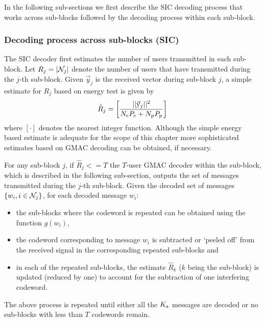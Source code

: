 In the following sub-sections we first describe the SIC decoding process that works across sub-blocks followed by the decoding process within each sub-block.

\subsubsection{Decoding process across sub-blocks (SIC)}
The SIC decoder first estimates the number of users transmitted in each sub-block. Let $R_j=|\mathcal{N}_j|$ denote the number of users that have transmitted during the $j$-th sub-block. Given $\vec{y}_j$ is the received vector during sub-block $j$, a simple estimate for $R_j$ based on energy test is given by %
\begin{align*}
\hat{R}_{j}= \left[\frac{||\vec{\mathrm{y}}_j||^2}{N_{\mathrm{c}}P_{\mathrm{c}}+N_{\mathrm{p}}P_{\mathrm{p}}}\right]
\end{align*} 
where $[\cdot ]$ denotes the nearest integer function. Although the simple energy based estimate is adequate for the scope of this chapter more sophisticated estimates based on GMAC decoding can be obtained, if necessary. 

For any sub-block $j$, if $\hat{R}_{j}<=T$ the $T$-user GMAC decoder within the sub-block, which is described in the following sub-section, outputs the set of messages transmitted during the $j$-th sub-block. Given the decoded set of messages $\{w_i, i \in \mathcal{N}_j\}$, for each decoded message $w_i$:
\begin{itemize}
\item the sub-blocks where the codeword is repeated can be obtained using the function $g(w_i)$,
\item  the codeword corresponding to message $w_i$ is subtracted or `peeled off' from the received signal in the corresponding repeated sub-blocks and
\item  in each of the repeated sub-blocks, the estimate $\hat{R}_k$ ($k$ being the sub-block) is updated (reduced by one) to account for the subtraction of one interfering codeword.
\end{itemize} 
The above process is repeated until either all the $K_{\text{a}}$ messages are decoded or no sub-blocks with less than $T$ codewords remain.\\

